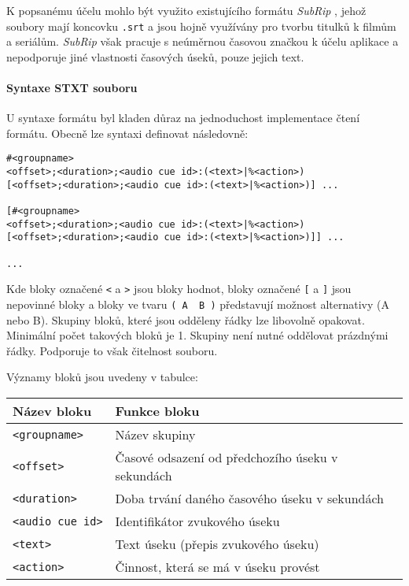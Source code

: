 K popsanému účelu mohlo být využito existujícího formátu \emph{SubRip} \autocite{subrip},
jehož soubory mají koncovku \texttt{.srt} a jsou hojně využívány pro
tvorbu titulků k filmům a seriálům. \emph{SubRip} však pracuje s
neúměrnou časovou značkou k účelu aplikace a nepodporuje jiné vlastnosti
časových úseků, pouze jejich text.

\paragraph{Syntaxe STXT souboru}\label{syntaxe-stxt-souboru}

U syntaxe formátu byl kladen důraz na jednoduchost implementace čtení
formátu. Obecně lze syntaxi definovat následovně:

\begin{verbatim}
#<groupname>
<offset>;<duration>;<audio cue id>:(<text>|%<action>)
[<offset>;<duration>;<audio cue id>:(<text>|%<action>)] ...

[#<groupname>
<offset>;<duration>;<audio cue id>:(<text>|%<action>)
[<offset>;<duration>;<audio cue id>:(<text>|%<action>)]] ...

...
\end{verbatim}

Kde bloky označené \texttt{\textless{}} a \texttt{\textgreater{}} jsou
bloky hodnot, bloky označené \texttt{{[}} a \texttt{{]}} jsou nepovinné
bloky a bloky ve tvaru \texttt{(\ A\ \textbar{}\ B\ )} představují
možnost alternativy (A nebo B). Skupiny bloků, které jsou odděleny řádky
lze libovolně opakovat. Minimální počet takových bloků je 1. Skupiny
není nutné oddělovat prázdnými řádky. Podporuje to však čitelnost souboru.

Významy bloků jsou uvedeny v tabulce:

\begin{longtable}[]{@{}ll@{}}
\toprule
Název bloku & Funkce bloku\tabularnewline
\midrule
\endhead
\texttt{\textless{}groupname\textgreater{}} & Název
skupiny\tabularnewline
\texttt{\textless{}offset\textgreater{}} & Časové odsazení od
předchozího úseku v sekundách\tabularnewline
\texttt{\textless{}duration\textgreater{}} & Doba trvání daného časového
úseku v sekundách\tabularnewline
\texttt{\textless{}audio\ cue\ id\textgreater{}} & Identifikátor
zvukového úseku\tabularnewline
\texttt{\textless{}text\textgreater{}} & Text úseku (přepis zvukového
úseku)\tabularnewline
\texttt{\textless{}action\textgreater{}} & Činnost, která se má v úseku
provést\tabularnewline
\bottomrule
\end{longtable}

